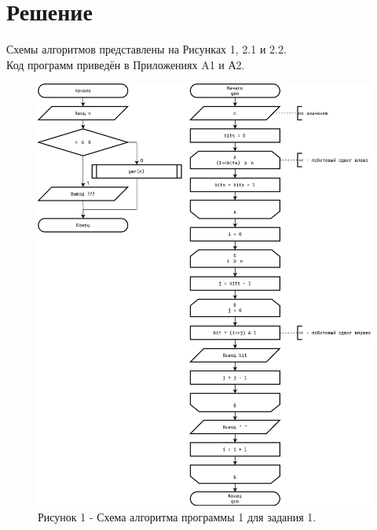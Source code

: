 \documentclass[oneside,a4paper,14pt]{extarticle}
\begin{document}
\section*{Решение}
\noindent Схемы алгоритмов представлены на Рисунках 1, 2.1 и 2.2. \\
\noindent Код программ приведён в Приложениях A1 и А2.\\
\begin{figure}[h!]
	\centering
	\includegraphics[height=0.75\textheight]{pics/flowchart_1.png}
	\caption*{Рисунок 1 - Схема алгоритма программы 1 для задания 1.}
\end{figure}
\end{document}
